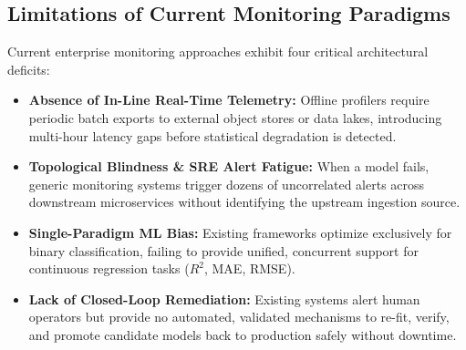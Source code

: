 \documentclass[conference]{IEEEtran}
\begin{document}
\subsection{Limitations of Current Monitoring Paradigms}
Current enterprise monitoring approaches exhibit four critical architectural deficits:
\begin{itemize}
    \item \textbf{Absence of In-Line Real-Time Telemetry:} Offline profilers require periodic batch exports to external object stores or data lakes, introducing multi-hour latency gaps before statistical degradation is detected.
    \item \textbf{Topological Blindness \& SRE Alert Fatigue:} When a model fails, generic monitoring systems trigger dozens of uncorrelated alerts across downstream microservices without identifying the upstream ingestion source.
    \item \textbf{Single-Paradigm ML Bias:} Existing frameworks optimize exclusively for binary classification, failing to provide unified, concurrent support for continuous regression tasks ($R^2$, MAE, RMSE).
    \item \textbf{Lack of Closed-Loop Remediation:} Existing systems alert human operators but provide no automated, validated mechanisms to re-fit, verify, and promote candidate models back to production safely without downtime.
\end{itemize}
\end{document}
